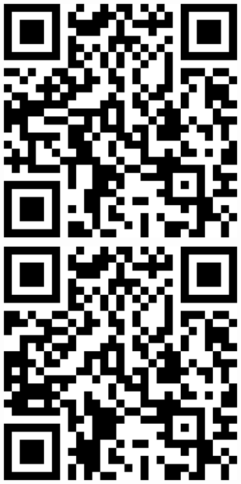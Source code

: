 \documentclass[letterpaper]{article}
\begin{document}
 \endgroup 
 \vspace*{\fill} 
 \pagebreak 
{} 
 \vspace*{\fill} 
 \begingroup 
 \centerline{\includegraphics[scale=1,width=5in,height=5in]{Office3573.png}} 
 \endgroup 
 \vspace*{\fill} 
 \pagebreak 
{} 
 \vspace*{\fill} 
 \begingroup 
 \centerline{\includegraphics[scale=1,width=5in,height=5in]{Office3575.png}} 
\end{document}
